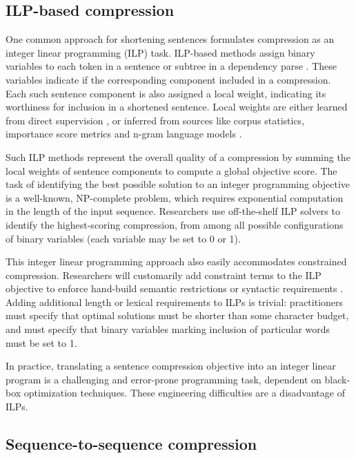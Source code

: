 \documentclass[11pt,a4paper]{article}
\begin{document}
\subsection{ILP-based compression}\label{s:ilps}

One common approach for shortening sentences formulates compression as an integer linear programming (ILP) task. ILP-based methods assign binary variables to each token in a sentence \cite{clarke2008global} or subtree in a dependency parse \cite{filippova2008dependency}. These variables indicate if the corresponding component included in a compression. Each such sentence component is also assigned a local weight, indicating its worthiness for inclusion in a shortened sentence. Local weights are either learned from direct supervision \cite{filippova2013overcoming,Wang2017CanSH}, or inferred from sources like corpus statistics, importance score metrics and n-gram language models \cite{clarke2008global,filippova2008dependency}.

Such ILP methods represent the overall quality of a compression by summing the local weights of sentence components to compute a global objective score.  The task of identifying the best possible solution to an integer programming objective is a well-known, NP-complete problem, which requires exponential computation in the length of the input sequence. Researchers use off-the-shelf ILP solvers to identify the highest-scoring compression, from among all possible configurations of binary variables (each variable may be set to 0 or 1).

This integer linear programming approach also easily accommodates constrained compression. Researchers will customarily add constraint terms to the ILP objective to enforce hand-build semantic restrictions \cite{clarke2008global} or syntactic requirements \cite{filippova2008dependency}. Adding additional length or lexical requirements to ILPs is trivial: practitioners must specify that optimal solutions must be shorter than some character budget, and must specify that binary variables marking inclusion of particular words must be set to 1. 

In practice, translating a sentence compression objective into an integer linear program is a challenging and error-prone programming task, dependent on black-box optimization techniques. These engineering difficulties are a disadvantage of ILPs.

\subsection{Sequence-to-sequence compression}
\end{document}
